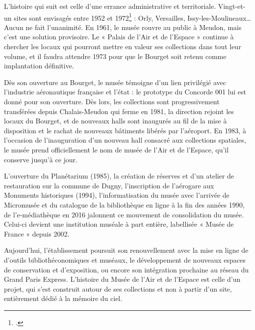 L’histoire qui suit est celle d’une errance administrative et territoriale. Vingt-et-un sites sont envisagés entre 1952 et 1972\footcite{terrier_eroport_2019} : Orly, Versailles, Issy-les-Moulineaux… Aucun ne fait l’unanimité. En 1961, le musée rouvre au public à Meudon, mais c’est une solution provisoire. Le « Palais de l’Air et de l’Espace » continue à chercher les locaux qui pourront mettre en valeur ses collections dans tout leur volume, et il faudra attendre 1973 pour que le Bourget soit retenu comme implantation définitive.

Dès son ouverture au Bourget, le musée témoigne d'un lien privilégié avec l'industrie aéronautique française et l'état : le prototype du Concorde 001 lui est donné pour son ouverture. Dès lors, les collections sont progressivement transférées depuis Chalais-Meudon qui ferme en 1981, la direction rejoint les locaux du Bourget, et de nouveaux halls sont inaugurés au fil de la mise à disposition et le rachat de nouveaux bâtiments libérés par l'aéroport. En 1983, à l'occasion de l'inauguration d'un nouveau hall consacré aux collections spatiales, le musée prend officiellement le nom de musée de l'Air et de l'Espace, qu'il conserve jusqu'à ce jour.

L’ouverture du Planétarium (1985), la création de réserves et d'un atelier de restauration sur la commune de Dugny, l’inscription de l’aérogare aux Monuments historiques (1994), l'informatisation du musée avec l’arrivée de Micromusée et du catalogue de la bibliothèque en ligne à la fin des années 1990, de l’e-médiathèque en 2016 jalonnent ce mouvement de consolidation du musée. Celui-ci devient une institution muséale à part entière, labellisée « Musée de France » depuis 2002.

Aujourd’hui, l’établissement poursuit son renouvellement avec la mise en ligne de d'outils bibliothéconomiques et muséaux, le développement de nouveaux espaces de conservation et d'exposition, ou encore son intégration prochaine au réseau du Grand Paris Express. L’histoire du Musée de l’Air et de l’Espace est celle d'un projet, qui s’est construit autour de ses collections et non à partir d’un site, entièrement dédié à la mémoire du ciel.


